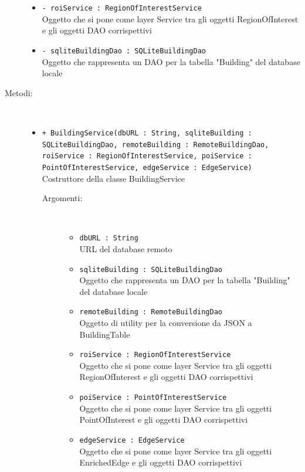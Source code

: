\documentclass[../DefinizioneDiProdotto.tex]{subfiles}
\begin{document}
\begin{description}
\begin{itemize}
		\item \texttt{- roiService : RegionOfInterestService}\\
		Oggetto che si pone come layer Service tra gli oggetti RegionOfInterest e gli oggetti DAO corrispettivi
		
		\item \texttt{- sqliteBuildingDao : SQLiteBuildingDao}\\
		Oggetto che rappresenta un DAO per la tabella "Building" del database locale
		
	\end{itemize}
	\item[Metodi:] \
	\begin{itemize}
		\item \texttt{+ BuildingService(dbURL : String, sqliteBuilding :\\ SQLiteBuildingDao, remoteBuilding : RemoteBuildingDao, roiService : RegionOfInterestService, poiService :\\ PointOfInterestService, edgeService : EdgeService)}\\
		Costruttore della classe BuildingService
		\begin{description}
			\item[Argomenti:] \
			\begin{itemize}
				\item \texttt{dbURL : String}\\
				URL del database remoto\item \texttt{sqliteBuilding : SQLiteBuildingDao}\\
				Oggetto che rappresenta un DAO per la tabella "Building" del database locale\item \texttt{remoteBuilding : RemoteBuildingDao}\\
				Oggetto di utility per la conversione da JSON a BuildingTable\item \texttt{roiService : RegionOfInterestService}\\
				Oggetto che si pone come layer Service tra gli oggetti RegionOfInterest e gli oggetti DAO corrispettivi\item \texttt{poiService : PointOfInterestService}\\
				Oggetto che si pone come layer Service tra gli oggetti PointOfInterest e gli oggetti DAO corrispettivi\item \texttt{edgeService : EdgeService}\\
				Oggetto che si pone come layer Service tra gli oggetti EnrichedEdge e gli oggetti DAO corrispettivi\end{itemize}

\end{description}
\end{itemize}
\end{description}
\end{document}
